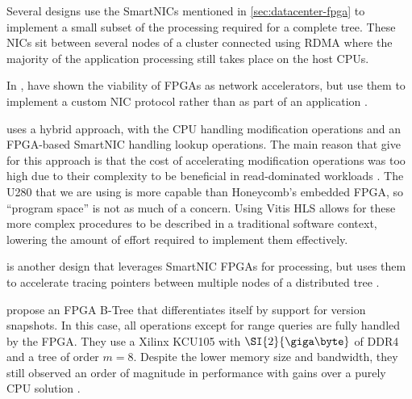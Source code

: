

Several designs \autocite{honeycomb,strom,star} use the SmartNICs mentioned in
\ref{sec:datacenter-fpga} to implement a small subset of the processing required
for a complete tree. These NICs sit between several nodes of a cluster connected
using RDMA where the majority of the application processing still takes place on
the host CPUs.

In , \citeauthor{star} have shown the viability of FPGAs as
network accelerators, but use them to implement a custom NIC protocol rather
than as part of an application \autocite{star}.


 uses a hybrid approach, with the CPU handling modification
operations and an FPGA-based SmartNIC handling lookup operations. The main
reason that \citeauthor{honeycomb} give for this approach is that the cost of
accelerating modification operations was too high due to their complexity to be
beneficial in read-dominated workloads \autocite{honeycomb}. The U280 that we
are using is more capable than Honeycomb's embedded FPGA, so ``program space''
is not as much of a concern. Using Vitis HLS allows for these more complex
procedures to be described in a traditional software context, lowering the
amount of effort required to implement them effectively.

 is another design that leverages SmartNIC FPGAs for
processing, but uses them to accelerate tracing pointers between multiple nodes
of a distributed tree \autocite{strom}.

\citeauthor{ren-fpl-2019} propose an FPGA B-Tree that differentiates itself by
support for version snapshots. In this case, all operations except for range
queries are fully handled by the FPGA. They use a Xilinx KCU105 with
$\SI{2}{\giga\byte}$ of DDR4 and a tree of order $m=8$. Despite the lower memory
size and bandwidth, they still observed an order of magnitude in performance with
gains over a purely CPU solution \autocite{ren-fpl-2019}.
